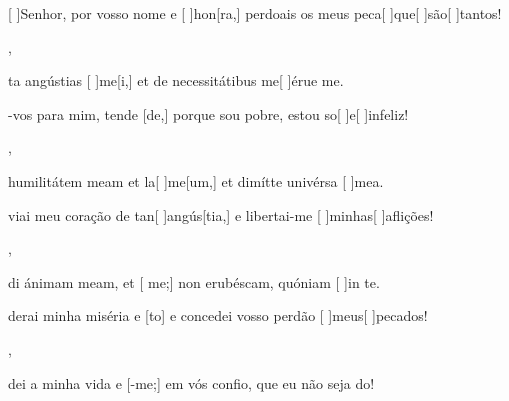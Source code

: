 {    {\item {}[ ]{Se}nhor, por vosso nome e [ ]{hon}[ra,] perdoais os meus peca[ ]{que}[ ]{são}[ ]{tan}tos!~\Antiphona},
  {\item {}ta angústias [ ]{me}[i,] et de necessitátibus me[ ]{é}{ru}{e} me.~\Antiphona}%
    {\item {}-vos para mim, tende [de,] porque sou pobre, estou so[ ]{e}[ ]{in}feliz!~\Antiphona},
  {\item {} humilitátem meam et la[ ]{me}[um,] et dimítte univérsa [ ]{me}a.~\Antiphona}%
    {\item {}viai meu coração de tan[ ]{an}{gús}[tia,] e libertai-me [ ]{mi}{nhas}[ ]{a}flições!~\Antiphona},
  {\item {}di ánimam meam, et [ me;] non erubéscam, quóniam [ ]{in} te.~\Antiphona}%
    {\item {}derai minha miséria e [to] e concedei vosso perdão [ ]{meus}[ ]{pe}{ca}dos!~\Antiphona},
  {~\Antiphona}%
    {\item {}dei a minha vida e [-me;] em vós confio, que eu não seja do!~\Antiphona}
}